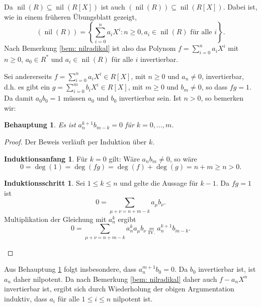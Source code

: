 \documentclass[a4paper,10pt]{article}
\newcounter{satze}
\newtheorem{beh}[satze]{Behauptung}
\theoremstyle{definition}
\newtheorem*{ia}{Induktionsanfang}
\newtheorem*{is}{Induktionsschritt}
\newcommand{\nil}{\operatorname{nil}}
\begin{document}
Da $\nil(R) \subseteq \nil(R[X])$ ist auch $\left(\nil(R)\right) \subseteq \nil(R[X])$. Dabei ist, wie in einem früheren Übungsblatt gezeigt,
\[
 \left(\nil(R)\right)
 = \left\{\sum_{i=0}^n a_i X^i : n \geq 0, a_i \in \nil(R) \text{ für alle } i\right\}.
\]
Nach Bemerkung \ref{bem: nilradikal} ist also das Polynom $f = \sum_{i=0}^n a_i X^i$ mit $n \geq 0$, $a_0 \in R^*$ und $a_i \in \nil(R)$ für alle $i$ invertierbar.

Sei andererseits $f = \sum_{i=0}^n a_i X^i \in R[X]$, mit $n \geq 0$ und $a_n \neq 0$, invertierbar, d.h. es gibt ein $g = \sum_{i=0}^m b_i X^i \in R[X]$, mit $m \geq 0$ und $b_m \neq 0$, so dass $fg = 1$. Da damit $a_0 b_0 = 1$ müssen $a_0$ und $b_0$ invertierbar sein. Ist $n > 0$, so bemerken wir:

\begin{beh}\label{beh: a_n nilpotent}
 Es ist $a_n^{k+1} b_{m-k} = 0$ für $k=0,\ldots,m$.
\end{beh}
\begin{proof}
 Der Beweis verläuft per Induktion über $k$.
 \begin{ia}Für $k=0$ gilt: Wäre $a_n b_m \neq 0$, so wäre
  \[
   0 = \deg(1) = \deg(fg) = \deg(f)+\deg(g) = n+m \geq n > 0.
  \]
 \end{ia}
 \begin{is}
 Sei $1 \leq k \leq n$ und gelte die Aussage für $k-1$. Da $fg = 1$ ist
 \[
  0 = \sum_{\mu+\nu = n+m-k} a_\mu b_\nu.
 \]
 Multiplikation der Gleichung mit $a_n^k$ ergibt
 \[
  0 = \sum_{\mu+\nu = n+m-k} a_n^k a_\mu b_\nu \underset{\text{IV.}}= a_n^{k+1} b_{m-k}.
 \]
 \end{is}
\end{proof}
Aus Behauptung \ref{beh: a_n nilpotent} folgt insbesondere, dass $a_n^{m+1} b_0 = 0$. Da $b_0$ invertierbar ist, ist $a_n$ daher nilpotent. Da nach Bemerkung \ref{bem: nilradikal} daher auch $f- a_n X^n$ invertierbar ist, ergibt sich durch Wiederholung der obigen Argumentation induktiv, dass $a_i$ für alle $1 \leq i \leq n$ nilpotent ist.










\section{}
\end{document}
